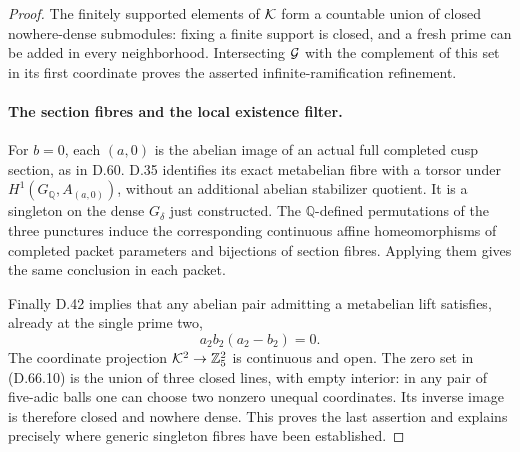 \begin{proof}
The finitely supported elements of \({\cal K}\) form
a countable union of closed nowhere-dense submodules:
fixing a finite support is closed, and a fresh prime
can be added in every neighborhood. Intersecting
\({\cal G}\) with the complement of this set in its
first coordinate proves the asserted infinite-ramification
refinement.

\paragraph{The section fibres and the local existence filter.}
For \(b=0\), each \((a,0)\) is the abelian image of
an actual full completed cusp section, as in D.60.
D.35 identifies its exact metabelian fibre with a torsor
under \(H^1(G_{\mathbb Q},A_{(a,0)})\), without an
additional abelian stabilizer quotient. It is a singleton
on the dense \(G_\delta\) just constructed. The
\(\mathbb Q\)-defined permutations of the three
punctures induce the corresponding continuous affine
homeomorphisms of completed packet parameters and
bijections of section fibres. Applying them gives the
same conclusion in each packet.

Finally D.42 implies that any abelian pair admitting a
metabelian lift satisfies, already at the single prime two,
\[
                        a_2b_2(a_2-b_2)=0.             \tag{D.66.10}
\]
The coordinate projection \({\cal K}^2\to\mathbb Z_5^2\)
is continuous and open. The zero set in (D.66.10) is
the union of three closed lines, with empty interior:
in any pair of five-adic balls one can choose two
nonzero unequal coordinates. Its inverse image is
therefore closed and nowhere dense. This proves the
last assertion and explains precisely where generic
singleton fibres have been established.
\end{proof}

